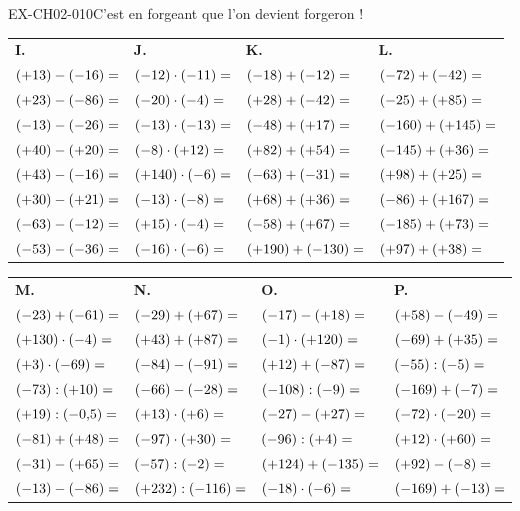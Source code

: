 \begin{exercice}{EX-CH02-010}{C’est en forgeant que l’on devient forgeron !}
{\bigskip
\begin{tabularx}{\linewidth}{*{4}{X}}
\textbf{I.} & \textbf{J.} & \textbf{K.} & \textbf{L.} \\
$(+13)-(-16)= \dotfill$ & $(-12)\cdot(-11)= \dotfill$ & $(-18)+(-12)= \dotfill$ & $(-72)+(-42)= \dotfill$ \\
$(+23)-(-86)= \dotfill$ & $(-20)\cdot(-4)= \dotfill$ & $(+28)+(-42)= \dotfill$ & $(-25)+(+85)= \dotfill$ \\
$(-13)-(-26)= \dotfill$ & $(-13)\cdot(-13)= \dotfill$ & $(-48)+(+17)= \dotfill$ & $(-160)+(+145)= \dotfill$ \\
$(+40)-(+20)= \dotfill$ & $(-8)\cdot(+12)= \dotfill$ & $(+82)+(+54)= \dotfill$ & $(-145)+(+36)= \dotfill$ \\
$(+43)-(-16)= \dotfill$ & $(+140)\cdot(-6)= \dotfill$ & $(-63)+(-31)= \dotfill$ & $(+98)+(+25)= \dotfill$ \\
$(+30)-(+21)= \dotfill$ & $(-13)\cdot(-8)= \dotfill$ & $(+68)+(+36)= \dotfill$ & $(-86)+(+167)= \dotfill$ \\
$(-63)-(-12)= \dotfill$ & $(+15)\cdot(-4)= \dotfill$ & $(-58)+(+67)= \dotfill$ & $(-185)+(+73)= \dotfill$ \\
$(-53)-(-36)= \dotfill$ & $(-16)\cdot(-6)= \dotfill$ & $(+190)+(-130)= \dotfill$ & $(+97)+(+38)= \dotfill$ \\
\end{tabularx}

\bigskip
\begin{tabularx}{\linewidth}{*{4}{X}}
\textbf{M.} & \textbf{N.} & \textbf{O.} & \textbf{P.} \\
$(-23)+(-61)= \dotfill$ & $(-29)+(+67)= \dotfill$ & $(-17)-(+18)= \dotfill$ & $(+58)-(-49)= \dotfill$ \\
$(+130)\cdot(-4)= \dotfill$ & $(+43)+(+87)= \dotfill$ & $(-1)\cdot(+120)= \dotfill$ & $(-69)+(+35)= \dotfill$ \\
$(+3)\cdot(-69)= \dotfill$ & $(-84)-(-91)= \dotfill$ & $(+12)+(-87)= \dotfill$ & $(-55):(-5)= \dotfill$ \\
$(-73):(+10)= \dotfill$ & $(-66)-(-28)= \dotfill$ & $(-108):(-9)= \dotfill$ & $(-169)+(-7)= \dotfill$ \\
$(+19):(-0{,}5)= \dotfill$ & $(+13)\cdot(+6)= \dotfill$ & $(-27)-(+27)= \dotfill$ & $(-72)\cdot(-20)= \dotfill$ \\
$(-81)+(+48)= \dotfill$ & $(-97)\cdot(+30)= \dotfill$ & $(-96):(+4)= \dotfill$ & $(+12)\cdot(+60)= \dotfill$ \\
$(-31)-(+65)= \dotfill$ & $(-57):(-2)= \dotfill$ & $(+124)+(-135)= \dotfill$ & $(+92)-(-8)= \dotfill$ \\
$(-13)-(-86)= \dotfill$ & $(+232):(-116)= \dotfill$ & $(-18)\cdot(-6)= \dotfill$ & $(-169)+(-13)= \dotfill$ \\
\end{tabularx}}

\end{exercice}

